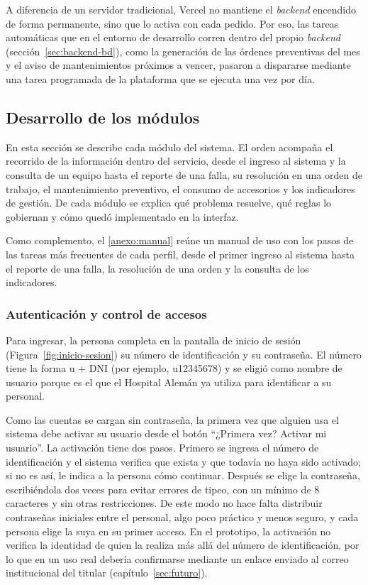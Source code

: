 \documentclass[10pt]{article}
\begin{document}
A diferencia de un servidor tradicional, Vercel no mantiene el \textit{backend} encendido de forma permanente, sino que lo activa con cada pedido. Por eso, las tareas automáticas que en el entorno de desarrollo corren dentro del propio \textit{backend} (sección~\ref{sec:backend-bd}), como la generación de las órdenes preventivas del mes y el aviso de mantenimientos próximos a vencer, pasaron a dispararse mediante una tarea programada de la plataforma que se ejecuta una vez por día.

\subsection{Desarrollo de los módulos}
\label{sec:desarrollo-modulos}
En esta sección se describe cada módulo del sistema. El orden acompaña el recorrido de la información dentro del servicio, desde el ingreso al sistema y la consulta de un equipo hasta el reporte de una falla, su resolución en una orden de trabajo, el mantenimiento preventivo, el consumo de accesorios y los indicadores de gestión. De cada módulo se explica qué problema resuelve, qué reglas lo gobiernan y cómo quedó implementado en la interfaz.

Como complemento, el \ref{anexo:manual} reúne un manual de uso con los pasos de las tareas más frecuentes de cada perfil, desde el primer ingreso al sistema hasta el reporte de una falla, la resolución de una orden y la consulta de los indicadores.

\subsubsection{Autenticación y control de accesos}
Para ingresar, la persona completa en la pantalla de inicio de sesión (Figura~\ref{fig:inicio-sesion}) su número de identificación y su contraseña. El número tiene la forma u + DNI (por ejemplo, u12345678) y se eligió como nombre de usuario porque es el que el Hospital Alemán ya utiliza para identificar a su personal.

Como las cuentas se cargan sin contraseña, la primera vez que alguien usa el sistema debe activar su usuario desde el botón “¿Primera vez? Activar mi usuario”. La activación tiene dos pasos. Primero se ingresa el número de identificación y el sistema verifica que exista y que todavía no haya sido activado; si no es así, le indica a la persona cómo continuar. Después se elige la contraseña, escribiéndola dos veces para evitar errores de tipeo, con un mínimo de 8 caracteres y sin otras restricciones. De este modo no hace falta distribuir contraseñas iniciales entre el personal, algo poco práctico y menos seguro, y cada persona elige la suya en su primer acceso. En el prototipo, la activación no verifica la identidad de quien la realiza más allá del número de identificación, por lo que en un uso real debería confirmarse mediante un enlace enviado al correo institucional del titular (capítulo~\ref{sec:futuro}). 
\end{document}
